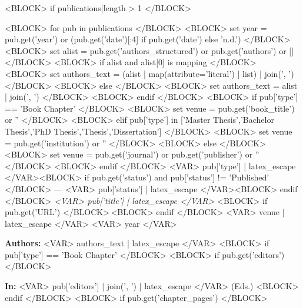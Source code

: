 <BLOCK> if publications|length > 1 </BLOCK>


\begin{cventries}
<BLOCK> for pub in publications </BLOCK>
  <BLOCK> set year = pub.get('year') or (pub.get('date')[:4] if pub.get('date') else 'n.d.') </BLOCK>
  <BLOCK> set alist = pub.get('authors_structured') or pub.get('authors') or [] </BLOCK>
  <BLOCK> if alist and alist[0] is mapping </BLOCK>
    <BLOCK> set authors_text = (alist | map(attribute='literal') | list) | join(', ') </BLOCK>
  <BLOCK> else </BLOCK>
    <BLOCK> set authors_text = alist | join(', ') </BLOCK>
  <BLOCK> endif </BLOCK>
  <BLOCK> if pub['type'] == 'Book Chapter' </BLOCK>
    <BLOCK> set venue = pub.get('book_title') or '' </BLOCK>
  <BLOCK> elif pub['type'] in ['Master Thesis','Bachelor Thesis','PhD Thesis','Thesis','Dissertation'] </BLOCK>
    <BLOCK> set venue = pub.get('institution') or '' </BLOCK>
  <BLOCK> else </BLOCK>
    <BLOCK> set venue = pub.get('journal') or pub.get('publisher') or '' </BLOCK>
  <BLOCK> endif </BLOCK>
  \cventry
    {<VAR> pub['type'] | latex_escape </VAR><BLOCK> if pub.get('status') and pub['status'] != 'Published' </BLOCK> — <VAR> pub['status'] | latex_escape </VAR><BLOCK> endif </BLOCK>} %
    {%
      \textit{<VAR> pub['title'] | latex_escape </VAR>}%
      <BLOCK> if pub.get('URL') </BLOCK>\,{\href{<VAR> pub['URL'] </VAR>}{\honorlocationstyle{[LINK]}}}<BLOCK> endif </BLOCK>
    } %
    {<VAR> venue | latex_escape </VAR>} %
    {<VAR> year </VAR>} %
    {%
      \begin{cvitems}
        \item {\textbf{Authors:} <VAR> authors_text | latex_escape </VAR>}
        <BLOCK> if pub['type'] == 'Book Chapter' </BLOCK>
          <BLOCK> if pub.get('editors') </BLOCK>
            \item {\textbf{In:} <VAR> pub['editors'] | join(', ') | latex_escape </VAR> (Eds.)}
          <BLOCK> endif </BLOCK>
          <BLOCK> if pub.get('chapter_pages') </BLOCK>

\end{cvitems}}
\end{cventries}
